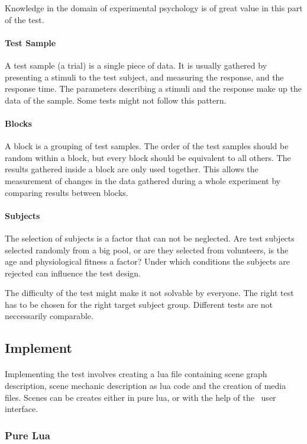 Knowledge in the domain of experimental psychology is of great value in this part of the test.

\paragraph{Test Sample}
A test sample (a trial) is a single piece of data.
It is usually gathered by presenting a stimuli to the test subject,
and measuring the response, and the response time.
The parameters describing a stimuli and the response make up the data of the sample.
Some tests might not follow this pattern.

\paragraph{Blocks}
A block is a grouping of test samples.
The order of the test samples should be random within a block, but every block should be equivalent to all others.
The results gathered inside a block are only used together.
This allows the measurement of changes in the data gathered during a whole experiment by comparing results between blocks.

\paragraph{Subjects}
The selection of subjects is a factor that can not be neglected.
Are test subjects selected randomly from a big pool, or are they selected from volunteers,
is the age and physiological fitness a factor?
Under which conditions the subjects are rejected can influence the test design.

The difficulty of the test might make it not solvable by everyone.
The right test has to be chosen for the right target subject group.
Different tests are not neccessarily comparable.


\subsection{Implement}
\paragraph{}
Implementing the test involves creating a lua file containing scene graph description,
scene mechanic description as lua code and the creation of media files.
Scenes can be creates either in pure lua, or with the help of the \ER\ user interface.

\subsubsection{Pure Lua}
